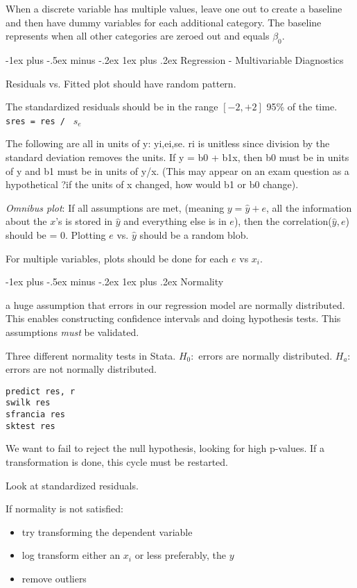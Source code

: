 \documentclass[10pt,landscape]{article}
\makeatletter
\renewcommand{\subsubsection}{\@startsection{subsubsection}{3}{0mm}%
                                {-1ex plus -.5ex minus -.2ex}%
                                {1ex plus .2ex}%
                                {\normalfont\small\bfseries}}
\makeatother
\begin{document}
\begin{multicols*}{3}
When a discrete variable has multiple values, leave one out to create a baseline and then have dummy variables for each additional category. The baseline represents when all other categories are zeroed out and equals $\beta_0$. 

\subsubsection{Regression - Multivariable Diagnostics}

Residuals vs. Fitted plot should have random pattern.

The standardized residuals should be in the range $[-2, +2]$ 95\% of the time.  \texttt{sres = res / } $s_e$

The following are all in units of y: yi,ei,se. ri is unitless since division by the standard deviation removes the units. If y = b0 + b1x, then b0 must be in units of y and b1 must be in units of y/x. (This may appear on an exam question as a hypothetical ?if the units of x changed, how would b1 or b0 change).

\textit{Omnibus plot}: If all assumptions are met, (meaning $y = \hat{y} + e$, all the information about the $x$'s is stored in $\hat{y}$ and everything else is in $e$), then the correlation($\hat{y},e$) should be = 0. Plotting $e$ vs. $\hat{y}$ should be a random blob.

For multiple variables, plots should be done for each $e$ vs $x_i$.


\subsubsection{Normality}

a huge assumption that errors in our regression model are normally distributed. This enables constructing confidence intervals and doing hypothesis tests. This assumptions \textit{must} be validated.

Three different normality tests in Stata. $H_0:$ errors are normally distributed. $H_a:$ errors are not normally distributed.
\begin{verbatim}
predict res, r
swilk res
sfrancia res
sktest res
\end{verbatim}

We want to fail to reject the null hypothesis, looking for high p-values. If a transformation is done, this cycle must be restarted.

Look at standardized residuals.

If normality is not satisfied:
\begin{itemize}
\item{try transforming the dependent variable}
\item{log transform either an $x_i$ or less preferably, the $y$}
\item{remove outliers}
\end{itemize}


\end{multicols*}
\end{document}
